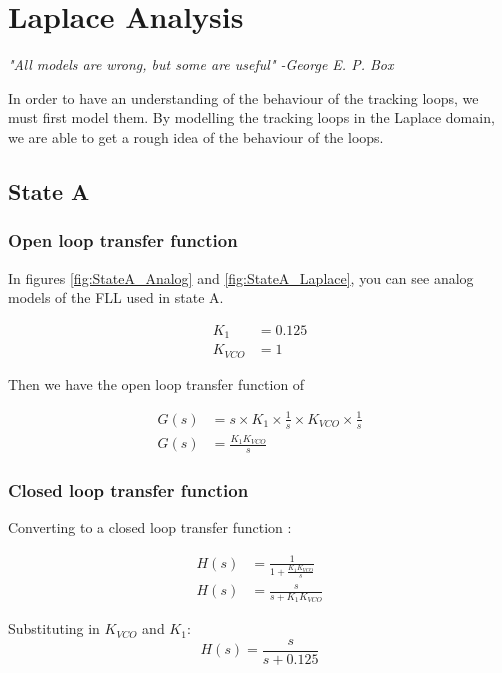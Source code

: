 \chapter{Laplace Analysis}
\label{ch:LaplaceAnalysis}

\emph{"All models are wrong, but some are useful" -George E. P. Box}

In order to have an understanding of the behaviour of the tracking loops, we must first model them. By modelling the tracking loops in the Laplace domain, we are able to get a rough idea of the behaviour of the loops. 



\section{State A}



\subsection{Open loop transfer function}
In figures \ref{fig:StateA_Analog} and \ref{fig:StateA_Laplace}, you can see analog models of the FLL used in state A. 

\begin{align*}
K_1 &= 0.125\\
K_{VCO} &= 1
\end{align*}

Then we have the open loop transfer function of 

\begin{align}
G(s) &= s  \times K_1 \times \frac{1}{s} \times  
K_{VCO} \times \frac{1}{s}\\
G(s) &= \frac{K_1 K_{VCO}}{s}
\end{align}

\subsection{Closed loop transfer function}
Converting to a closed loop transfer function :

\begin{align}
H(s) &= \frac{1}{1+\frac{K_1 K_{VCO}}{s}}\\
H(s) &= \frac{s}{s+K_1 K_{VCO}}
\end{align}

Substituting in $K_{VCO}$ and $K_1$: 
\begin{equation}
H(s) = \frac{s}{s+0.125}
\end{equation}

